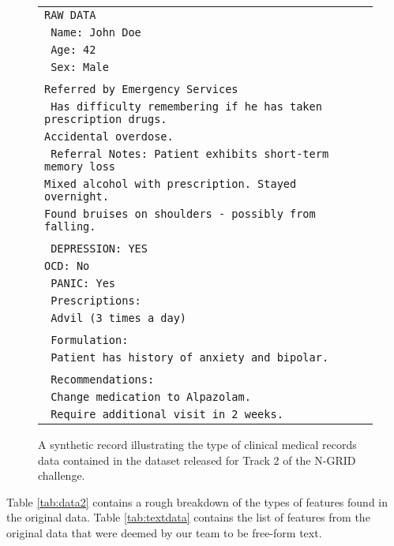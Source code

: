 \begin{figure}[t]
\begin{tabular}{|l|}
\hline
\texttt{RAW DATA}\\
\texttt{    Name: John Doe}\\
  \texttt{  Age: 42}\\
\texttt{    Sex: Male}\\
\\
    \texttt{Referred by Emergency Services}
\\    
\texttt{    Has difficulty remembering if he has taken prescription drugs.}\\ \texttt{Accidental overdose.}
\\    
\texttt{    Referral Notes: Patient exhibits short-term memory loss}\\
\texttt{Mixed alcohol with
    prescription. Stayed overnight.}\\
\texttt{Found bruises on shoulders - possibly from falling.}\\
\\   
  \texttt{  DEPRESSION: YES}
  \\
  \texttt{OCD: No}
\\
\texttt{    PANIC: Yes}
\\    
\texttt{    Prescriptions:}\\
    \texttt{ Advil (3 times a day)}\\
\\         
\texttt{    Formulation:}
\\
\texttt{    Patient has history of anxiety and bipolar.}\\
\\    
\texttt{    Recommendations:}
\\
\texttt{    Change medication to Alpazolam.}
\\
\texttt{    Require additional visit in 2 weeks.}
\\    
\hline
\end{tabular}
\caption{A synthetic record illustrating the type of clinical medical records data contained in the
dataset released for Track 2 of the N-GRID challenge.}
\label{fig:sampleRecord}
\end{figure}

Table \ref{tab:data2} contains a rough breakdown of the types of features found in the original data. 
Table
\ref{tab:textdata} contains the list of features from the original data that 
were deemed by our team to be free-form text.



